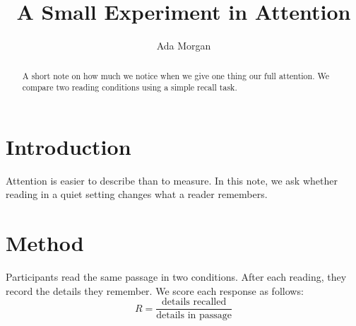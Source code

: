 \documentclass[11pt,a4paper]{article}
\title{A Small Experiment in Attention}
\author{Ada Morgan}
\date{}
\begin{document}
\maketitle

\begin{abstract}
  A short note on how much we notice when we give one
  thing our full attention. We compare two reading
  conditions using a simple recall task.
\end{abstract}

\section{Introduction}
Attention is easier to describe than to measure. In
this note, we ask whether reading in a quiet setting
changes what a reader remembers.

\section{Method}
Participants read the same passage in two conditions.
After each reading, they record the details they
remember. We score each response as follows:
\[
  R = \frac{\text{details recalled}}
           {\text{details in passage}}
\]


\end{document}
